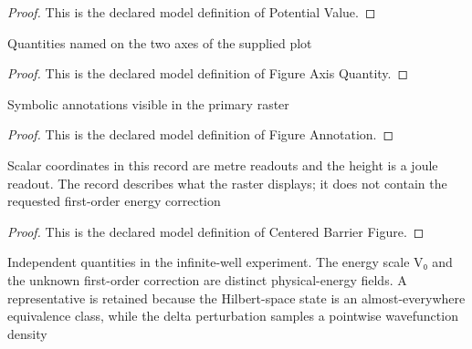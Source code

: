 \begin{proof}
  This is the declared model definition of Potential Value.
\end{proof}
\begin{definition}
  \label{def:physics:phyx-mini-0546:phyxminiproblems-problemphyxmini0546-figureaxisquantity}
  Quantities named on the two axes of the supplied plot
\end{definition}
\begin{proof}
  This is the declared model definition of Figure Axis Quantity.
\end{proof}
\begin{definition}
  \label{def:physics:phyx-mini-0546:phyxminiproblems-problemphyxmini0546-figureannotation}
  Symbolic annotations visible in the primary raster
\end{definition}
\begin{proof}
  This is the declared model definition of Figure Annotation.
\end{proof}
\begin{definition}
  \label{def:physics:phyx-mini-0546:phyxminiproblems-problemphyxmini0546-centeredbarrierfigure}
  Scalar coordinates in this record are metre readouts and the height is a joule readout. The record describes what the raster displays; it does not contain the requested first-order energy correction
\end{definition}
\begin{proof}
  This is the declared model definition of Centered Barrier Figure.
\end{proof}
\begin{definition}
  \label{def:physics:phyx-mini-0546:phyxminiproblems-problemphyxmini0546-infinitewelldeltasetup}
  Independent quantities in the infinite-well experiment. The energy scale V₀ and the unknown first-order correction are distinct physical-energy fields. A representative is retained because the Hilbert-space state is an almost-everywhere equivalence class, while the delta perturbation samples a pointwise wavefunction density
\end{definition}
